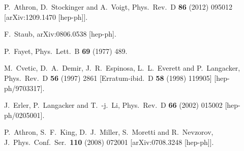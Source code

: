\documentclass[final,3p,11pt,pdflatex]{elsarticle}
\begin{document}
\begin{thebibliography}{100}
  P.~Athron, D.~Stockinger and A.~Voigt,
  Phys.\ Rev.\ D {\bf 86} (2012) 095012
  [arXiv:1209.1470 [hep-ph]].

  F.~Staub,
  arXiv:0806.0538 [hep-ph].

  P.~Fayet,
  Phys.\ Lett.\ B {\bf 69} (1977) 489.

  M.~Cvetic, D.~A.~Demir, J.~R.~Espinosa, L.~L.~Everett and P.~Langacker,
  Phys.\ Rev.\ D {\bf 56} (1997) 2861
   [Erratum-ibid.\ D {\bf 58} (1998) 119905]
  [hep-ph/9703317].

  J.~Erler, P.~Langacker and T.~-j.~Li,
  Phys.\ Rev.\ D {\bf 66} (2002) 015002
  [hep-ph/0205001].

  P.~Athron, S.~F.~King, D.~J.~Miller, S.~Moretti and R.~Nevzorov,
  J.\ Phys.\ Conf.\ Ser.\  {\bf 110} (2008) 072001
  [arXiv:0708.3248 [hep-ph]].

\end{thebibliography}
\end{document}
